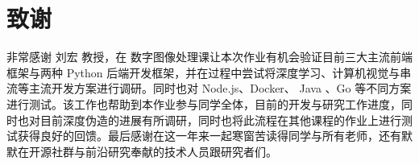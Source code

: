 \chapter{致谢}

非常感谢 刘宏 教授，在  数字图像处理课让本次作业有机会验证目前三大主流前端框架与两种 Python 后端开发框架，并在过程中尝试将深度学习、计算机视觉与串流等主流开发方案进行调研。同时也对 Node.js、Docker、 Java 、Go 等不同方案进行测试。该工作也帮助到本作业参与同学全体，目前的开发与研究工作进度，同时也对目前深度伪造的进展有所调研，同时也将此流程在其他课程的作业上进行测试获得良好的回馈。最后感谢在这一年来一起寒窗苦读得同学与所有老师，还有默默在开源社群与前沿研究奉献的技术人员跟研究者们。